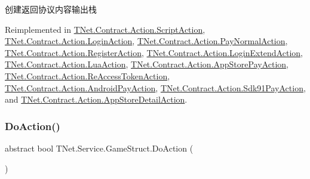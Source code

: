创建返回协议内容输出栈 



Reimplemented in \mbox{\hyperlink{class_t_net_1_1_contract_1_1_action_1_1_script_action_a23cfcb658cff38a503301f66ca5e97b1}{T\+Net.\+Contract.\+Action.\+Script\+Action}}, \mbox{\hyperlink{class_t_net_1_1_contract_1_1_action_1_1_login_action_abad56bdb3d581655eb0f5b7ea13f529e}{T\+Net.\+Contract.\+Action.\+Login\+Action}}, \mbox{\hyperlink{class_t_net_1_1_contract_1_1_action_1_1_pay_normal_action_ab651bf055c2afe438f69d440942226c2}{T\+Net.\+Contract.\+Action.\+Pay\+Normal\+Action}}, \mbox{\hyperlink{class_t_net_1_1_contract_1_1_action_1_1_register_action_a6640b98c166bee0a946e5a89916f8f73}{T\+Net.\+Contract.\+Action.\+Register\+Action}}, \mbox{\hyperlink{class_t_net_1_1_contract_1_1_action_1_1_login_extend_action_a44cd85d17ec24e8fa99317d243bb2aa2}{T\+Net.\+Contract.\+Action.\+Login\+Extend\+Action}}, \mbox{\hyperlink{class_t_net_1_1_contract_1_1_action_1_1_lua_action_a729cfe92a20d39f52f74e76cbe573304}{T\+Net.\+Contract.\+Action.\+Lua\+Action}}, \mbox{\hyperlink{class_t_net_1_1_contract_1_1_action_1_1_app_store_pay_action_a8d473e0f226db2fc98e8c543fc674874}{T\+Net.\+Contract.\+Action.\+App\+Store\+Pay\+Action}}, \mbox{\hyperlink{class_t_net_1_1_contract_1_1_action_1_1_re_access_token_action_a722f628b8496ce0561bc0f190657d46f}{T\+Net.\+Contract.\+Action.\+Re\+Access\+Token\+Action}}, \mbox{\hyperlink{class_t_net_1_1_contract_1_1_action_1_1_android_pay_action_a244870e41516e232e4f2d78effd6b405}{T\+Net.\+Contract.\+Action.\+Android\+Pay\+Action}}, \mbox{\hyperlink{class_t_net_1_1_contract_1_1_action_1_1_sdk91_pay_action_a37f97a0cae08625043cac4f804e1c368}{T\+Net.\+Contract.\+Action.\+Sdk91\+Pay\+Action}}, and \mbox{\hyperlink{class_t_net_1_1_contract_1_1_action_1_1_app_store_detail_action_a036adb761ead3ae30b7f2e2cd33f2eaa}{T\+Net.\+Contract.\+Action.\+App\+Store\+Detail\+Action}}.

\mbox{\label{class_t_net_1_1_service_1_1_game_struct_a7a4391eb55bba0a76637b1d58e6fdea9}} 
\subsubsection{\texorpdfstring{Do\+Action()}{DoAction()}}
{\footnotesize\ttfamily abstract bool T\+Net.\+Service.\+Game\+Struct.\+Do\+Action (\begin{DoxyParamCaption}{ }\end{DoxyParamCaption})\hspace{0.3cm}{\ttfamily [pure virtual]}}



